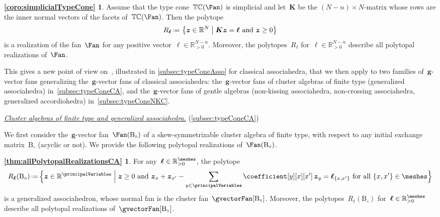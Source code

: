 \documentclass{amsart}
\theoremstyle{definition}
\newcommand{\R}{\mathbb{R}} %
\renewcommand{\b}[1]{{\boldsymbol{#1}}} %
\newcommand{\set}[2]{\left\{ #1 \;\middle|\; #2 \right\}} %
\newcommand{\Bigset}[2]{\Big\{ #1 \;\Big|\; #2 \Big\}} %
\newcommand{\eqdef}{\mbox{\,\raisebox{0.2ex}{\scriptsize\ensuremath{\mathrm:}}\ensuremath{=}\,}} %
\newcommand{\para}[1]{\medskip\noindent\uline{\textit{#1.}}} %
\newcommand{\typeCone}{\mathbb{TC}} %
\newcommand{\B}{\mathrm{B}} %
\begin{document}
\newtheorem*{coro:simplicialTypeCone}{\cref{coro:simplicialTypeCone}}
\begin{coro:simplicialTypeCone}
Assume that the type cone~$\typeCone(\Fan)$ is simplicial and let~$\b{K}$ be the $(N-n) \times N$-matrix whose rows are the inner normal vectors of the facets of~$\typeCone(\Fan)$. Then the polytope
\[
R_\b{\ell} \eqdef \set{\b{z} \in \R^N}{\b{K}\b{z} = \b{\ell} \text{ and } \b{z} \ge 0}
\]
is a realization of the fan~$\Fan$ for any positive vector~$\b{\ell} \in \R_{>0}^{N-n}$.
Moreover, the polytopes~$R_\b{\ell}$ for~$\b{\ell} \in \R_{>0}^{N-n}$ describe all polytopal realizations of~$\Fan$.
\end{coro:simplicialTypeCone}

This gives a new point of view on~\cite{ArkaniHamedBaiHeYan,BazierMatteChapelierLaguetDouvilleMousavandThomasYildirim}, illustrated in \cref{subsec:typeConeAsso} for classical associahedra, that we then apply to two families of~$\b{g}$-vector fans generalizing the~$\b{g}$-vector fans of classical associahedra: the~$\b{g}$-vector fans of cluster algebras of finite type (generalized associahedra) in~\cref{subsec:typeConeCA}, and the~$\b{g}$-vector fans of gentle algebras (non-kissing associahedra, non-crossing associahedra, generalized accordiohedra) in~\cref{subsec:typeConeNKC}.

\para{Cluster algebras of finite type and generalized associahedra}
(\cref{subsec:typeConeCA})

\noindent
We first consider the~$\b{g}$-vector fan~$\Fan(\B_\circ)$ of a skew-symmetrizable cluster algebra of finite type, with respect to any initial exchange matrix~$\B_\circ$ (acyclic or not). We provide the following polytopal realizations of~$\Fan(\B_\circ)$.

\newtheorem*{thm:allPolytopalRealizationsCA}{\cref{thm:allPolytopalRealizationsCA}}
\begin{thm:allPolytopalRealizationsCA}
For any~$\b{\ell} \in \R_{>0}^{\meshes}$, the polytope
\[
R_{\b{\ell}}(\B_\circ) \eqdef \Bigset{\b{z} \in \R^{\principalVariables}}{\b{z} \ge 0 \text{ and } \b{z}_x + \b{z}_{x'} - \sum_{y \in \principalVariables} \coefficient[y][x][x'] \, \b{z}_{y} = \b{\ell}_{\{x,x'\}} \text{ for all } \{x,x'\} \in \meshes}
\]
is a generalized associahedron, whose normal fan is the cluster fan~$\gvectorFan[\B_\circ]$.
Moreover, the polytopes~$R_\b{\ell}(\B_\circ)$ for~$\b{\ell} \in \R_{>0}^{\meshes}$ describe all polytopal realizations of~$\gvectorFan[\B_\circ]$.
\end{thm:allPolytopalRealizationsCA}
\end{document}
